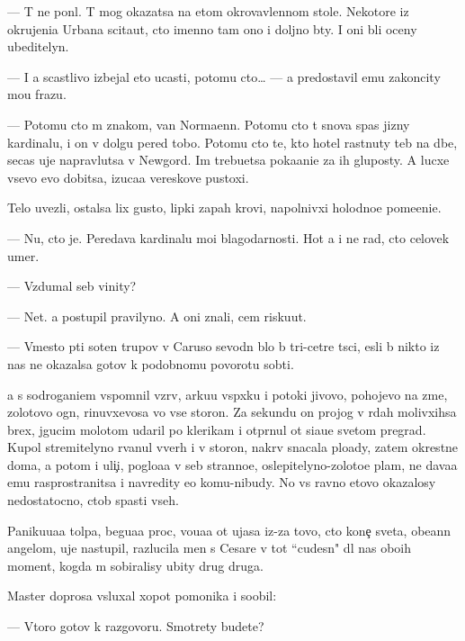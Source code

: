 \documentclass[10pt]{book}
\begin{document}
— T{\yi} ne pon{\ia}l. T{\yi} mog okazatsa na etom okrovavlennom stole. Nekotor{\yi}{\y}e iz okrujeni{\y}a Urbana scita{\y}ut, cto imenno tam ono i doljno b{\yi}ty. I oni b{\yi}li oceny ubeditelyn{\yi}.

— I {\y}a scastlivo izbejal eto{\y} ucasti, potomu cto… — {\Y}a predostavil {\y}emu zakoncity mo{\y}u frazu.

— Potomu cto m{\yi} znakom{\yi}, van Normaenn. Potomu cto t{\yi} snova spas jizny kardinalu, i on v dolgu pered tobo{\y}. Potomu cto te, kto hotel rast{\ia}nuty teb{\ia} na d{\yi}be, se{\y}cas uje napravl{\ia}{\y}utsa v Newgord. Im trebu{\y}etsa poka{\y}ani{\y}e za ih gluposty. A lucxe vsevo {\y}evo dobitsa, izuca{\y}a vereskov{\yi}{\y}e pustoxi.

Telo uvezli, ostalsa lix gusto{\y}, lipki{\y} zapah krovi, napolnivxi{\y} holodno{\y}e po\-me\-{\x}e\-ni\-{\y}e.

— Nu, cto je. Peredava{\y} kardinalu mo{\y}i blagodarnosti. Hot{\ia} {\y}a i ne rad, cto celovek umer.

— Vzdumal seb{\ia} vinity?

— Net. {\Y}a postupil pravilyno. A oni znali, cem risku{\y}ut.

— Vmesto p{\ia}ti soten trupov v Caruso sevodn{\ia} b{\yi}lo b{\yi} tri-cet{\yi}re t{\yi}s{\ia}ci, {\y}esli b{\yi} nikto iz nas ne okazalsa gotov k podobnomu povorotu sob{\yi}ti{\y}.

{\Y}a s sodrogani{\y}em vspomnil vzr{\yi}v, {\y}arku{\y}u vsp{\yi}xku i potoki jivovo, pohojevo na zme{\y}, zolotovo ogn{\ia}, rinuvxevosa vo vse storon{\yi}. Za sekundu on projog v r{\ia}dah molivxihsa brex, jgucim molotom udaril po klerikam i otpr{\ia}nul ot si{\y}a{\y}u{\x}e{\y} svetom pregrad{\yi}. Kupol stremitelyno rvanul vverh i v storon{\yi}, nakr{\yi}v snacala plo{\x}ady, zatem okrestn{\yi}{\y}e doma, a potom i uli{\c}i, poglo{\x}a{\y}a v seb{\ia} stranno{\y}e, oslepitelyno-zoloto{\y}e plam{\ia}, ne dava{\y}a {\y}emu rasprostranitsa i navredity {\y}e{\x}o komu-nibudy. No vs{\e} ravno etovo okazalosy nedostatocno, ctob{\yi} spasti vseh.

Paniku{\y}u{\x}a{\y}a tolpa, begu{\x}a{\y}a proc, vo{\y}u{\x}a{\y}a ot ujasa iz-za tovo, cto kone{\c} sveta, obe{\x}ann{\yi}{\y} angelom, uje nastupil, razlucila men{\ia} s Cesare v tot ``cudesn{\yi}{\y}" dl{\ia} nas obo{\y}ih moment, kogda m{\yi} sobiralisy ubity drug druga.

Master doprosa v{\yi}sluxal xopot pomo{\x}nika i soob{\x}il:

— Vtoro{\y} gotov k razgovoru. Smotrety budete?
\end{document}
